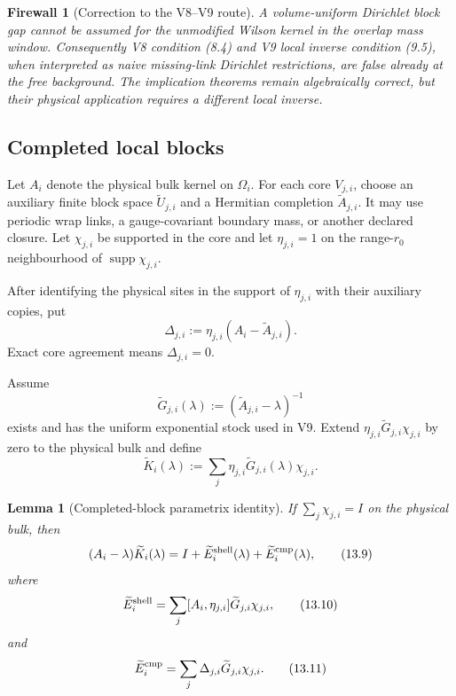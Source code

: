\documentclass[11pt]{article}
\newtheorem{lemma}[theorem]{Lemma}
\newtheorem{firewall}[theorem]{Firewall}
\newcommand{\supp}{\operatorname{supp}}
\begin{document}
\begin{firewall}[Correction to the V8--V9 route]
\label{fw:v11v13-dirichlet-correction}
A volume-uniform Dirichlet block gap cannot be assumed for the unmodified
Wilson kernel in the overlap mass window.  Consequently V8 condition
(8.4) and V9 local inverse condition (9.5), when interpreted as naive
missing-link Dirichlet restrictions, are false already at the free
background.  The implication theorems remain algebraically correct, but
their physical application requires a different local inverse.
\end{firewall}

\subsection{Completed local blocks}

Let \(A_i\) denote the physical bulk kernel on \(\Omega_i\).  For each
core \(V_{j,i}\), choose an auxiliary finite block space
\(\widetilde U_{j,i}\) and a Hermitian completion
\(\widetilde A_{j,i}\).  It may use periodic wrap links, a
gauge-covariant boundary mass, or another declared closure.  Let
\(\chi_{j,i}\) be supported in the core and let \(\eta_{j,i}=1\) on the
range-\(r_0\) neighbourhood of \(\supp\chi_{j,i}\).

After identifying the physical sites in the support of \(\eta_{j,i}\)
with their auxiliary copies, put
\[
 \Delta_{j,i}:=
 \eta_{j,i}(A_i-\widetilde A_{j,i}).
 \tag{13.6}
\]
Exact core agreement means \(\Delta_{j,i}=0\).

Assume
\[
 \widetilde G_{j,i}(\lambda)
 :=
 (\widetilde A_{j,i}-\lambda)^{-1}
 \tag{13.7}
\]
exists and has the uniform exponential stock used in V9.  Extend
\(\eta_{j,i}\widetilde G_{j,i}\chi_{j,i}\) by zero to the physical bulk
and define
\[
 \widetilde K_i(\lambda)
 :=
 \sum_j
 \eta_{j,i}\widetilde G_{j,i}(\lambda)\chi_{j,i}.
 \tag{13.8}
\]

\begin{lemma}[Completed-block parametrix identity]
\label{lem:v11v13-completed-identity}
If \(\sum_j\chi_{j,i}=I\) on the physical bulk, then
\[
 (A_i-\lambda)\widetilde K_i(\lambda)
 =
 I+\widetilde E_i^{\rm shell}(\lambda)
 +\widetilde E_i^{\rm cmp}(\lambda),
 \tag{13.9}
\]
where
\[
 \widetilde E_i^{\rm shell}
 =
 \sum_j[A_i,\eta_{j,i}]
 \widetilde G_{j,i}\chi_{j,i},
 \tag{13.10}
\]
and
\[
 \widetilde E_i^{\rm cmp}
 =
 \sum_j\Delta_{j,i}
 \widetilde G_{j,i}\chi_{j,i}.
 \tag{13.11}
\]
\end{lemma}
\end{document}
